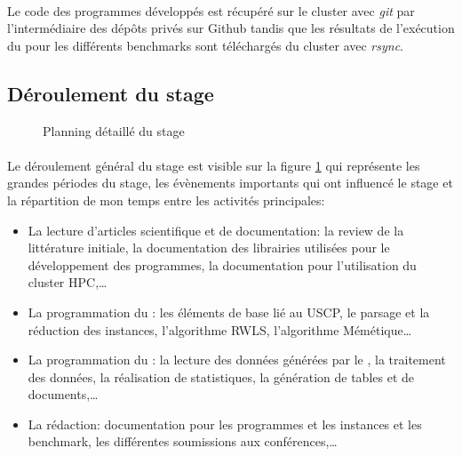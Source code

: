 \documentclass[a4paper,11pt,twoside,french,report]{../common/simplem}
\begin{document}
				\paragraph*{}
					Le code des programmes développés est récupéré sur le cluster avec \textit{git} par l'intermédiaire des dépôts privés sur Github tandis que les résultats de l'exécution du \solver{} pour les différents benchmarks sont téléchargés du cluster avec \textit{rsync}.
			\subsection{Déroulement du stage}\label{sec:planning}
				\begin{landscape}
					\begin{figure}[H]
						\centering%
						\hspace*{-0.5cm}
						\caption{Planning détaillé du stage}%
						\label{fig:planning}%
					\end{figure}
				\end{landscape}
				\paragraph*{}
					Le déroulement général du stage est visible sur la figure \ref{fig:planning} qui représente les grandes périodes du stage, les évènements importants qui ont influencé le stage et la répartition de mon temps entre les activités principales:
					\begin{itemize}
						\item La lecture d'articles scientifique et de documentation: la review de la littérature initiale, la documentation des librairies utilisées pour le développement des programmes, la documentation pour l'utilisation du cluster \gls{HPC},\ldots
						\item La programmation du \solver{}: les éléments de base lié au \gls{USCP}, le parsage et la réduction des instances, l'algorithme \gls{RWLS}, l'algorithme Mémétique\ldots
						\item La programmation du \printer{}: la lecture des données générées par le \solver{}, la traitement des données, la réalisation de statistiques, la génération de tables et de documents,\ldots
						\item La rédaction: documentation pour les programmes et les instances et les benchmark, les différentes soumissions aux conférences,\ldots
					\end{itemize}
\end{document}
